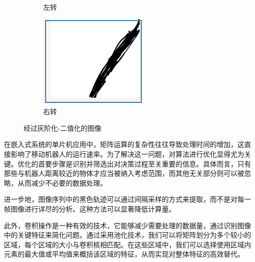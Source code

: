 \documentclass{report}
\begin{document}
\begin{figure}[ht]
\begin{subfigure}[b]{0.3\textwidth}
   \caption{左转}
   \label{fig:label}
 \end{subfigure}
 \hfill
 \begin{subfigure}[b]{0.3\textwidth}
   \centering
   \includegraphics[width=\textwidth]{figures/right.png}
   \caption{右转}
   \label{fig:label}
 \end{subfigure}
 \hfill
  \caption{经过灰阶化-二值化的图像}
\end{figure}

在嵌入式系统的单片机应用中，矩阵运算的复杂性往往导致处理时间的增加，这直接影响了移动机器人的运行速率。为了解决这一问题，对算法进行优化显得尤为关键。优化的首要步骤是识别并筛选出对决策过程至关重要的信息。具体而言，只有那些与机器人距离较近的物体才应当被纳入考虑范围，而其他无关部分则可以被忽略，从而减少不必要的数据处理。

进一步地，图像序列中的黑色轨迹可以通过间隔采样的方式来提取，而不是对每一帧图像进行详尽的分析。这种方法可以显著降低计算量。

此外，卷积操作是一种有效的技术，它能够减少需要处理的数据量，通过识别图像中的关键特征来简化问题。通过采用池化技术，我们可以将矩阵划分为多个较小的区域，每个区域的大小与卷积核相匹配。在这些区域中，我们可以选择使用区域内元素的最大值或平均值来概括该区域的特征，从而实现对整体特征的高效替代。
\end{document}
